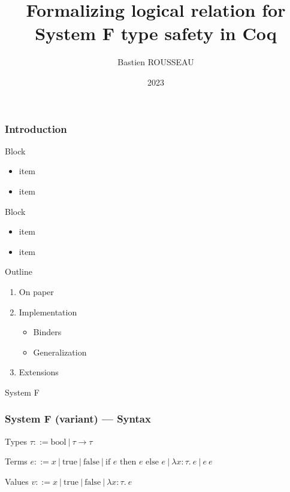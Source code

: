 \documentclass[xcolor={dvipsnames}]{beamer}
\title{Formalizing logical relation for System F type safety in Coq}
\author{Bastien ROUSSEAU}
\date{2023}
\newcommand\xxsectiontitle[1]{\begin{center}\Huge{#1}\end{center}}
\renewcommand\section[1]{\begin{frame}[noframenumbering]{}\xxsectiontitle{#1}\end{frame}}
\begin{document}
\frame{\titlepage}

\begin{frame}
  \frametitle{Introduction}

  \begin{block}{Block}
    \begin{itemize}
      \item item
      \item item
    \end{itemize}
  \end{block}

  \begin{block}{Block}
    \begin{itemize}
      \item item
      \item item
    \end{itemize}
  \end{block}

\end{frame}

\begin{frame}{Outline}
  \begin{enumerate}
    \item On paper
    \item Implementation
          \begin{itemize}
            \item Binders
            \item Generalization
          \end{itemize}
    \item Extensions
  \end{enumerate}
\end{frame}

\section{System F}%

\begin{frame}
  \frametitle{System F (variant) --- Syntax }

  \begin{block}{Types}
    $\tau ::= \mathrm{bool}\ |\ \tau \rightarrow \tau$
  \end{block}

  \begin{block}{Terms}
    $e ::= x\ |\ \mathrm{true}\ |\ \mathrm{false}\
    |\ \text{if } e \text{ then } e \text{ else } e\ |\ \lambda x : \tau.\ e\ |\ e\ e$
  \end{block}

  \begin{block}{Values}
    $v ::= x\ |\ \mathrm{true}\ |\ \mathrm{false}\ |\ \lambda x : \tau.\ e$
  \end{block}
\end{frame}
\end{document}
